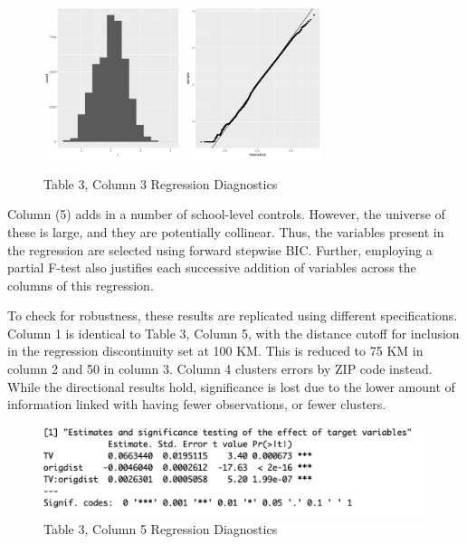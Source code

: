 \documentclass{article}
\begin{document}
\begin{figure}[!hbtp]
\centering
\caption{Table 3, Column 3 Regression Diagnostics}
\includegraphics[width=4cm]{../explore/Output/diagnostics/edu_AbsOLS3Hist.pdf}
\includegraphics[width=4cm]{../explore/Output/diagnostics/edu_AbsOLS3QQ.pdf}
\end{figure}


Column (5) adds in a number of school-level controls. However, the universe of these is large, and they are potentially collinear. Thus, the variables present in the regression are selected using forward stepwise BIC. Further, employing a partial F-test also justifies each successive addition of variables across the columns of this regression.

To check for robustness, these results are replicated using different specifications. Column 1 is identical to Table 3, Column 5, with the distance cutoff for inclusion in the regression discontinuity set at 100 KM. This is reduced to 75 KM in column 2 and 50 in column 3. Column 4 clusters errors by ZIP code instead. While the directional results hold, significance is lost due to the lower amount of information linked with having fewer observations, or fewer clusters.

%

\begin{figure}[!hbtp]
\centering
\caption{Table 3, Column 5 Regression Diagnostics}
\includegraphics[width=12cm]{../explore/Output/regs/edu_absLasso}
\end{figure} 
\end{document}
